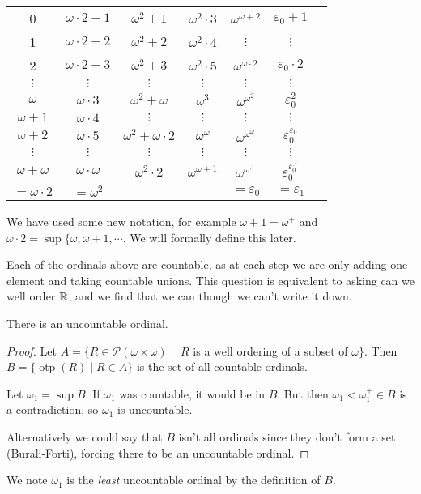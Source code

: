 \documentclass[a4paper, 10pt, twocolumn]{amsart}
\begin{document}
\begin{center}
  \small
  \begin{tabular}{ccccccc}
    0 & $\omega\cdot 2 + 1$ & $\omega^2 + 1$ & $\omega^2\cdot 3$ & $\omega^{\omega + 2}$ & $\varepsilon_0 + 1$ \\
    1 & $\omega\cdot 2 + 2$ & $\omega^2 + 2$ & $\omega^2\cdot 4$ & $\vdots$ & $\vdots$ \\
    2 & $\omega\cdot 2 + 3$ & $\omega^2 + 3$ & $\omega^2\cdot 5$ & $\omega^{\omega \cdot 2}$ & $\varepsilon_0 \cdot 2$ \\
    $\vdots$ & $\vdots$ & $\vdots$ & $\vdots$ & $\vdots$ & $\vdots$ \\
    $\omega$ & $\omega\cdot 3$ & $\omega^2 + \omega$ & $\omega^3$ & $\omega^{\omega^2}$ & $\varepsilon_0^2$ \\
    $\omega + 1$ & $\omega\cdot 4$ & $\vdots$ & $\vdots$ & $\vdots$ & $\vdots$ \\
    $\omega + 2$ & $\omega\cdot 5$ & $\omega^2 + \omega \cdot 2$ & $\omega^\omega$ & $\omega^{\omega^{\omega}}$ & $\varepsilon_0^{\varepsilon_0}$ \\
    $\vdots$ & $\vdots$ & $\vdots$ & $\vdots$ & $\vdots$ & $\vdots$ \\
    $\omega + \omega$ & $\omega\cdot \omega $ & $\omega^2 \cdot 2$ & $\omega^{\omega + 1}$ & $\omega^{\omega^{.^{.^.}}}$ & $\varepsilon_0^{\varepsilon_0^{.^{.^.}}}$ \\
    $=\omega\cdot 2$ & $=\omega^2$ & &  & $= \varepsilon_0$ & $= \varepsilon_1$ \\
  \end{tabular}
\end{center}

We have used some new notation, for example $\omega + 1 = \omega^+$ and $\omega \cdot 2 = \sup \{\omega, \omega+1, \cdots$. We will formally define this later.

Each of the ordinals above are countable, as at each step we are only adding one element and taking countable unions. This question is equivalent to asking can we well order $\mathbb{R}$, and we find that we can though we can't write it down.

\begin{theorem}
  There is an uncountable ordinal.
\end{theorem}
\begin{proof}
  Let $A = \{R \in \mathcal{P}(\omega \times \omega) \mid$ $R$ is a well ordering of a subset of $\omega \}$. 
  Then $B = \{\operatorname{otp}(R) \mid R \in A\}$ is the set of all countable ordinals. 

  Let $\omega_1 = \sup B$. If $\omega_1$ was countable, it would be in $B$. But then $\omega_1 < \omega_1^+ \in B$ is a contradiction, so $\omega_1$ is uncountable.


  Alternatively we could say that $B$ isn't all ordinals since they don't form a set (Burali-Forti), forcing there to be an uncountable ordinal. 
\end{proof}
We note $\omega_1$ is the \emph{least} uncountable ordinal by the definition of $B$.
\end{document}
